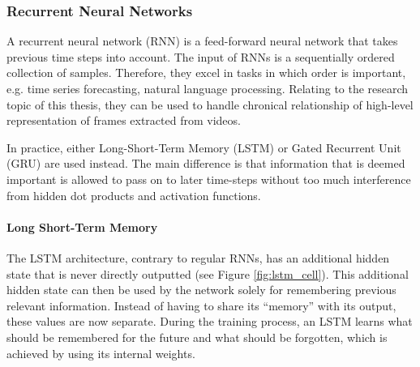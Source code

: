     \subsubsection{Recurrent Neural Networks}
        A recurrent neural network (RNN) is a feed-forward neural network that takes previous time steps into account.
        The input of RNNs is a sequentially ordered collection of samples.
        Therefore, they excel in tasks in which order is important, e.g. time series forecasting, natural language processing.
        Relating to the research topic of this thesis, they can be used to handle chronical relationship of high-level representation of frames extracted from videos.

        In practice, either Long-Short-Term Memory (LSTM) or Gated Recurrent Unit (GRU) are used instead. 
        The main difference is that information that is deemed important is allowed to pass on to later time-steps without too much interference from hidden dot products and activation functions.

        \paragraph{Long Short-Term Memory}
        The LSTM architecture, contrary to regular RNNs, has an additional hidden state that is never directly outputted (see Figure \ref{fig:lstm_cell}). 
        This additional hidden state can then be used by the network solely for remembering previous relevant information. 
        Instead of having to share its ``memory'' with its output, these values are now separate. 
        During the training process, an LSTM learns what should be remembered for the future and what should be forgotten, which is achieved by using its internal weights.

